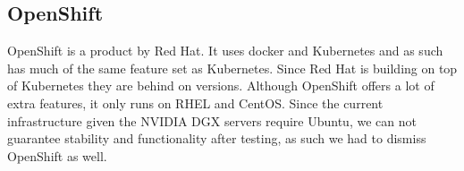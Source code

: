 \documentclass[../main.tex]{subfiles}
\begin{document}
\subsection*{OpenShift}
OpenShift is a product by Red Hat. It uses docker and Kubernetes and as such has much of the same feature set as Kubernetes. Since Red Hat is building on top of Kubernetes they are behind on versions. Although OpenShift offers a lot of extra features, it only runs on RHEL and CentOS. Since the current infrastructure given the NVIDIA DGX servers require Ubuntu, we can not guarantee stability and functionality after testing, as such we had to dismiss OpenShift as well. \cite{openshift}
\end{document}
